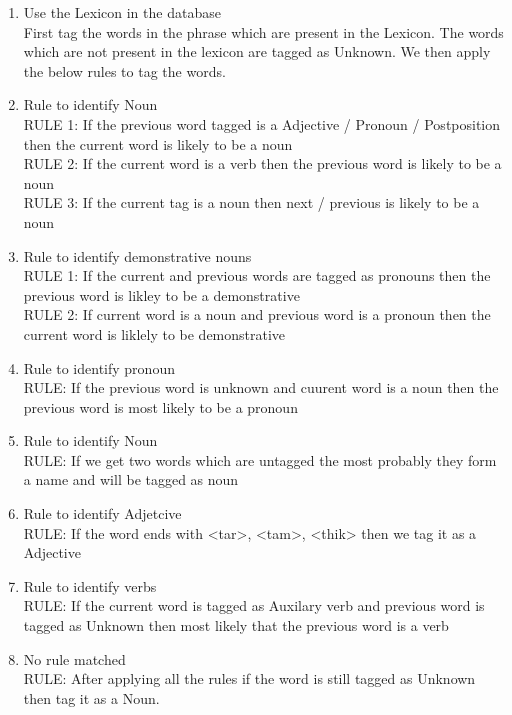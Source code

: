 \break
\begin{enumerate}
\item Use the Lexicon in the database \\
First tag the words in the phrase which are present in the Lexicon. The words which are not present in the lexicon are tagged as Unknown. We then apply the below rules to tag the words.

\item{Rule to identify Noun} \\
RULE 1: If the previous word tagged is a Adjective / Pronoun / Postposition then the current word is likely to be a noun \\	
RULE 2: If the current word is a verb then the previous word is likely to be a noun \\
RULE 3: If the current tag is a noun then next / previous is likely to be a noun
		
\item{Rule to identify demonstrative nouns} \\
RULE 1: If the current and previous words are tagged as pronouns then the previous word is likley to be a demonstrative \\
RULE 2: If current word is a noun and previous word is a pronoun then the current word is liklely to be demonstrative
		
\item{Rule to identify pronoun} \\
RULE: If the previous word is unknown and cuurent word is a noun then the previous word is most likely to be a pronoun
		
\item{Rule to identify Noun} \\		
RULE: If we get two words which are untagged the most probably they form a name and will be tagged as noun
		
\item{Rule to identify Adjetcive} \\
RULE: If the word ends with <tar>, <tam>, <thik> then we tag it as a Adjective
		
\item{Rule to identify verbs} \\
RULE: If the current word is tagged as Auxilary verb  and previous word is tagged as Unknown then most likely that the previous word is a verb

\item{No rule matched} \\
RULE: After applying all the rules if the word is still tagged as Unknown then tag it as a Noun.
		
\end{enumerate}
	
